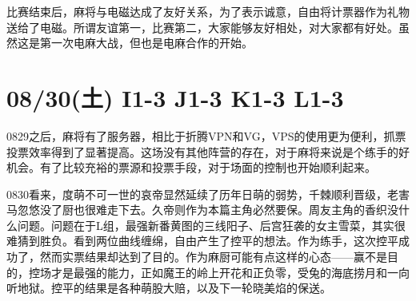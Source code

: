 比赛结束后，麻将与电磁达成了友好关系，为了表示诚意，自由将计票器作为礼物送给了电磁。所谓友谊第一，比赛第二，大家能够友好相处，对大家都有好处。虽然这是第一次电麻大战，但也是电麻合作的开始。

\section{08/30(土) I1-3 J1-3 K1-3 L1-3}


0829之后，麻将有了服务器，相比于折腾VPN和VG，VPS的使用更为便利，抓票投票效率得到了显著提高。这场没有其他阵营的存在，对于麻将来说是个练手的好机会。有了比较充裕的票源和投票手段，对于场面的控制也开始顺利起来。

0830看来，度萌不可一世的哀帝显然延续了历年日萌的弱势，千棘顺利晋级，老害马忽悠没了厨也很难走下去。久帝则作为本篇主角必然要保。周友主角的香织没什么问题。问题在于L组，最强新番黄图的三线阳子、后宫狂袭的女主雪菜，其实很难猜到胜负。看到两位曲线缠绵，自由产生了控平的想法。作为练手，这次控平成功了，然而实票结果却达到了目的。作为麻厨可能有点这样的心态——赢不是目的，控场才是最强的能力，正如魔王的岭上开花和正负零，受兔的海底捞月和一向听地狱。控平的结果是各种萌股大赔，以及下一轮晓美焰的保送。


